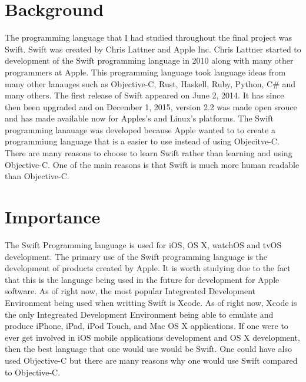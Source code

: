 \documentclass[11pt]{article}
\begin{document}


\vspace*{-.4in}
\section{Background}
\label{sec:background}
\vspace*{-.1in}
The programming language that I had studied throughout the final project was Swift. Swift was created by Chris Lattner and Apple Inc. Chris Lattner started to development of the Swift programming language in 2010 along with many other programmers at Apple. This programming language took language ideas from many other lanauges such as Objective-C, Rust, Haskell, Ruby, Python, C\# and many others. The first release of Swift appeared on June 2, 2014. It has since then been upgraded and on December 1, 2015, version 2.2 was made open srouce and has made available now for Apples's and Linux's platforms. The Swift programming lanauage was developed because Apple wanted to to create a programmiung language that is a easier to use instead of using Objecitve-C. There are many reasons to choose to learn Swift rather than learning and using Objective-C. One of the main reasons is that Swift is much more human readable than Objective-C. 

\vspace*{-.4in}
\section{Importance}
\label{sec:importance}
\vspace*{-.1in}
The Swift Programming language is used for iOS, OS X, watchOS and tvOS development. The primary use of the Swift programming language is the development of products created by Apple. It is worth studying due to the fact that this is the language being used in the future for development for Apple software. As of right now, the most popular Integreated Development Environment being used when writting Swift is Xcode. As of right now, Xcode is the only Integreated Development Environment being able to emulate and produce iPhone, iPad, iPod Touch, and Mac OS X applications. If one were to ever get involved in iOS mobile applications development and OS X development, then the best language that one would use would be Swift. One could have also used Objective-C but there are many reasons why one would use Swift compared to Objective-C.
\end{document}
